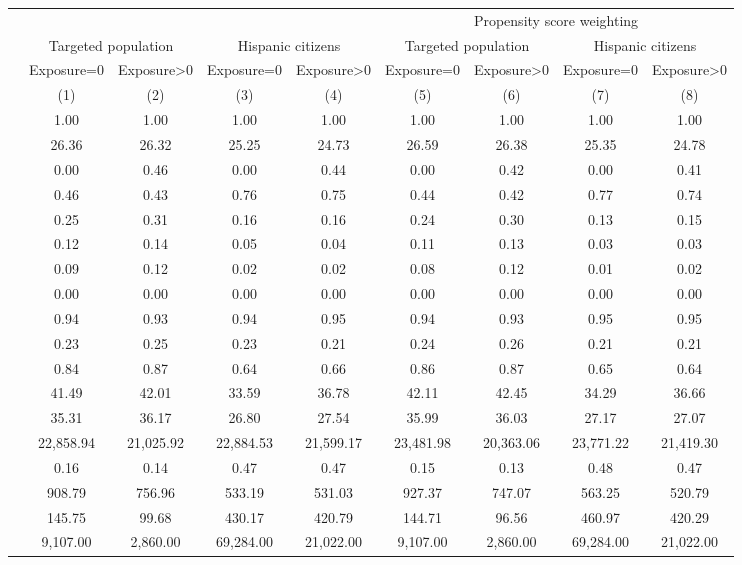 \begin{tabular}{lcccccccc}
\toprule
\toprule
 & & & & & \multicolumn{4}{c}{Propensity score weighting} \\
 & \multicolumn{2}{c}{Targeted population} & \multicolumn{2}{c}{Hispanic citizens} & \multicolumn{2}{c}{Targeted population} & \multicolumn{2}{c}{Hispanic citizens}  \\
 & Exposure=0 & Exposure>0 & Exposure=0 & Exposure>0 & Exposure=0 & Exposure>0 & Exposure=0 & Exposure>0 \\
 & (1) & (2) & (3) & (4) & (5) & (6) & (7) & (8) \\
\midrule 
   & 1.00 & 1.00 & 1.00 & 1.00 & 1.00 & 1.00 & 1.00 & 1.00\\
   & 26.36 & 26.32 & 25.25 & 24.73 & 26.59 & 26.38 & 25.35 & 24.78\\
   & 0.00 & 0.46 & 0.00 & 0.44 & 0.00 & 0.42 & 0.00 & 0.41\\
   & 0.46 & 0.43 & 0.76 & 0.75 & 0.44 & 0.42 & 0.77 & 0.74\\
   & 0.25 & 0.31 & 0.16 & 0.16 & 0.24 & 0.30 & 0.13 & 0.15\\
   & 0.12 & 0.14 & 0.05 & 0.04 & 0.11 & 0.13 & 0.03 & 0.03\\
   & 0.09 & 0.12 & 0.02 & 0.02 & 0.08 & 0.12 & 0.01 & 0.02\\
   & 0.00 & 0.00 & 0.00 & 0.00 & 0.00 & 0.00 & 0.00 & 0.00\\
   & 0.94 & 0.93 & 0.94 & 0.95 & 0.94 & 0.93 & 0.95 & 0.95\\
   & 0.23 & 0.25 & 0.23 & 0.21 & 0.24 & 0.26 & 0.21 & 0.21\\
   & 0.84 & 0.87 & 0.64 & 0.66 & 0.86 & 0.87 & 0.65 & 0.64\\
   & 41.49 & 42.01 & 33.59 & 36.78 & 42.11 & 42.45 & 34.29 & 36.66\\
   & 35.31 & 36.17 & 26.80 & 27.54 & 35.99 & 36.03 & 27.17 & 27.07\\
   & 22,858.94 & 21,025.92 & 22,884.53 & 21,599.17 & 23,481.98 & 20,363.06 & 23,771.22 & 21,419.30\\
   & 0.16 & 0.14 & 0.47 & 0.47 & 0.15 & 0.13 & 0.48 & 0.47\\
   & 908.79 & 756.96 & 533.19 & 531.03 & 927.37 & 747.07 & 563.25 & 520.79\\
   & 145.75 & 99.68 & 430.17 & 420.79 & 144.71 & 96.56 & 460.97 & 420.29\\
   & 9,107.00 & 2,860.00 & 69,284.00 & 21,022.00 & 9,107.00 & 2,860.00 & 69,284.00 & 21,022.00\\
\bottomrule
\bottomrule
\end{tabular}